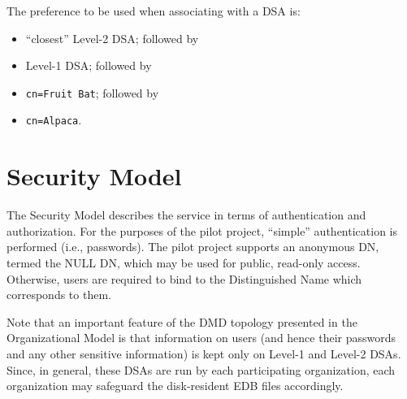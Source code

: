 The preference to be used when associating with a DSA is:
\begin{itemize}
\item	``closest'' Level-2 DSA; followed by

\item	Level-1 DSA; followed by

\item	\verb"cn=Fruit Bat"; followed by

\item	\verb"cn=Alpaca".
\end{itemize}

\section	{Security Model}
The Security Model describes the service in terms of authentication
and authorization.
For the purposes of the pilot project,
``simple'' authentication is performed (i.e., passwords).
The pilot project supports an anonymous DN, termed the NULL DN,
which may be used for public, read-only access.
Otherwise,
users are required to bind to the Distinguished Name which corresponds
to them.

Note that an important feature of the DMD topology presented in the
Organizational Model is that information on users
(and hence their passwords and any other sensitive information)
is kept only on Level-1 and Level-2 DSAs.
Since,
in general,
these DSAs are run by each participating organization,
each organization may safeguard the disk-resident EDB files accordingly.

